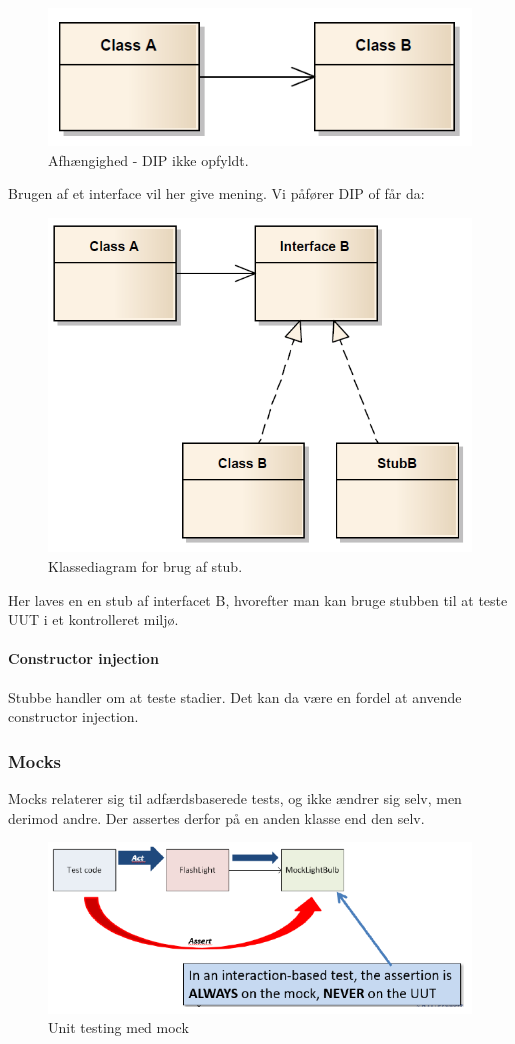 \begin{figure}[H]
	\centering
	\includegraphics[width=0.5\linewidth]{figs/stubNoInterface.PNG}
	\caption{Afhængighed - DIP ikke opfyldt.}
	\label{fig:stubNoInterface}
\end{figure}

Brugen af et interface vil her give mening. Vi påfører DIP of får da:

\begin{figure}[H]
	\centering
	\includegraphics[width=0.6\linewidth]{figs/stubInterface.PNG}
	\caption{Klassediagram for brug af stub.}
	\label{fig:stubInterface}
\end{figure}

Her laves en en stub af interfacet B, hvorefter man kan bruge stubben til at teste UUT i et kontrolleret miljø.

\paragraph{Constructor injection}
Stubbe handler om at teste stadier. Det kan da være en fordel at anvende constructor injection.

\subsubsection{Mocks}
Mocks relaterer sig til adfærdsbaserede tests, og ikke ændrer sig selv, men derimod andre. Der assertes derfor på en anden klasse end den selv.

\begin{figure}[H]
\centering
\includegraphics[width=0.7\linewidth]{figs/mockTest.PNG}
\caption{Unit testing med mock}
\label{fig:mockTest}
\end{figure}

